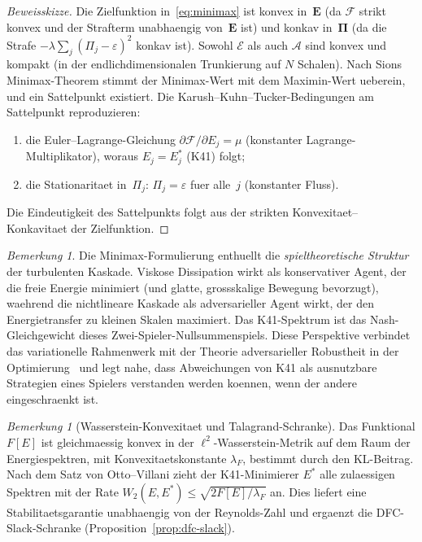 \documentclass[12pt,a4paper]{article}
\theoremstyle{definition}
\theoremstyle{plain}
\theoremstyle{remark}
\newtheorem{remark}[definition]{Bemerkung}
\begin{document}
\begin{proof}[Beweisskizze]
Die Zielfunktion in~\eqref{eq:minimax} ist konvex in~$\mathbf{E}$
(da $\mathcal{F}$ strikt konvex und der Strafterm unabhaengig
von~$\mathbf{E}$ ist) und konkav in~$\boldsymbol{\Pi}$ (da die Strafe
$-\lambda\sum_j(\Pi_j - \varepsilon)^2$ konkav ist). Sowohl
$\mathcal{E}$ als auch $\mathcal{A}$ sind konvex und kompakt (in der
endlichdimensionalen Trunkierung auf $N$ Schalen). Nach Sions
Minimax-Theorem stimmt der Minimax-Wert mit dem Maximin-Wert ueberein,
und ein Sattelpunkt existiert. Die Karush--Kuhn--Tucker-Bedingungen am
Sattelpunkt reproduzieren:
\begin{enumerate}[label=(\roman*)]
  \item die Euler--Lagrange-Gleichung
    $\partial\mathcal{F}/\partial E_j = \mu$ (konstanter
    Lagrange-Multiplikator), woraus $E_j = E_j^*$ (K41) folgt;
  \item die Stationaritaet in~$\Pi_j$:
    $\Pi_j = \varepsilon$ fuer alle~$j$ (konstanter Fluss).
\end{enumerate}
Die Eindeutigkeit des Sattelpunkts folgt aus der strikten
Konvexitaet--Konkavitaet der Zielfunktion.
\end{proof}

\begin{remark}
Die Minimax-Formulierung enthuellt die \emph{spieltheoretische Struktur}
der turbulenten Kaskade. Viskose Dissipation wirkt als konservativer
Agent, der die freie Energie minimiert (und glatte, grossskalige
Bewegung bevorzugt), waehrend die nichtlineare Kaskade als adversarieller
Agent wirkt, der den Energietransfer zu kleinen Skalen maximiert. Das
K41-Spektrum ist das Nash-Gleichgewicht dieses
Zwei-Spieler-Nullsummenspiels.
Diese Perspektive verbindet das variationelle Rahmenwerk mit der Theorie
adversarieller Robustheit in der Optimierung~\cite{Rockafellar70} und
legt nahe, dass Abweichungen von K41 als ausnutzbare Strategien eines
Spielers verstanden werden koennen, wenn der andere eingeschraenkt ist.
\end{remark}

\begin{remark}[Wasserstein-Konvexitaet und Talagrand-Schranke]
\label{rem:talagrand}
Das Funktional $F[E]$ ist gleichmaessig konvex in der $\ell^2$-Wasserstein-Metrik auf dem Raum der Energiespektren, mit Konvexitaetskonstante $\lambda_F$, bestimmt durch den KL-Beitrag. Nach dem Satz von Otto--Villani zieht der K41-Minimierer $E^*$ alle zulaessigen Spektren mit der Rate $W_2(E, E^*) \leq \sqrt{2 F[E] / \lambda_F}$ an. Dies liefert eine Stabilitaetsgarantie unabhaengig von der Reynolds-Zahl und ergaenzt die DFC-Slack-Schranke (Proposition~\ref{prop:dfc-slack}).
\end{remark}
\end{document}
